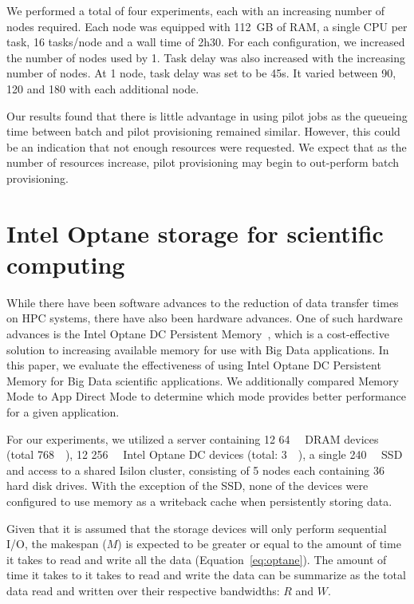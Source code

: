 \documentclass{report}
\begin{document}
       We performed a total of four experiments, each with an increasing number of nodes required.
       Each node was equipped with 112~GB of RAM, a single CPU per task, 16 tasks/node
       and a wall time of 2h30. For each configuration, we increased the number
       of nodes used by 1. Task delay was also increased with the increasing number
       of nodes. At 1 node, task delay was set to be 45s. It varied
        between 90, 120 and 180 with each additional node.


        Our results found that there is little advantage in using pilot 
        jobs as the queueing time between batch and pilot provisioning 
        remained similar. However, this could be an indication that not enough 
        resources were requested. We expect that  as the number of resources 
        increase, pilot provisioning may begin to out-perform batch provisioning.

        \section{Intel Optane storage for scientific computing}\label{section:ccgrid2020}


        While there have been software advances to the reduction of data transfer times
        on HPC systems, there have also been hardware advances. One of such 
        hardware advances is the Intel Optane DC Persistent Memory~\cite{optane}, which is a 
        cost-effective solution to increasing available memory for use with Big Data
        applications. In this paper, we evaluate the effectiveness of using
        Intel Optane DC Persistent Memory for Big Data scientific applications.
        We additionally compared Memory Mode to App Direct Mode to determine which
        mode provides better performance for a given application.
        
        For our experiments, we utilized a server containing 12 \SI{64}{\giga\byte} 
        DRAM devices (total
        \SI{768}{\giga\byte}), 12 \SI{256}{\giga\byte} Intel Optane DC devices (total:
        \SI{3}{\tera\byte}), a single \SI{240}{\giga\byte} SSD and access to
        a shared Isilon cluster, consisting of 5 nodes each containing 36 hard disk drives.
        With the exception of the SSD, none of the devices were configured to use memory
        as a writeback cache when persistently storing data.


        Given that it is assumed that the storage devices will only perform sequential
        I/O, the makespan ($M$) is expected to be greater or equal to the amount of time it
        takes to read and write all the data (Equation~\ref{eq:optane}).
        The amount of time it takes to  
        it takes to read and write the data can be summarize as the total data read
        and written over their respective bandwidths: $R$ and $W$.
\end{document}
